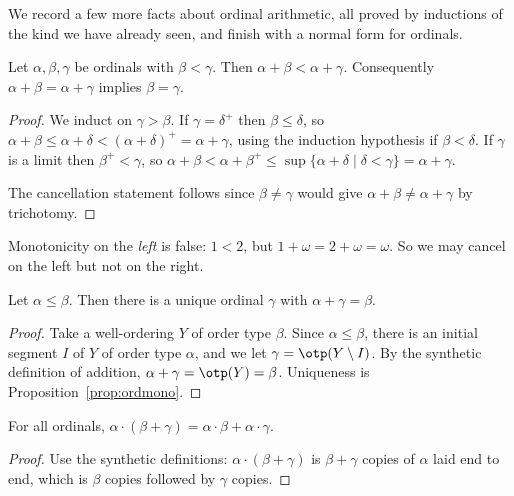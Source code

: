 We record a few more facts about ordinal arithmetic, all proved by inductions of the kind we have already seen, and finish with a normal form for ordinals.

\begin{proposition}\label{prop:ordmono}
  Let $\alpha, \beta, \gamma$ be ordinals with $\beta < \gamma$. Then $\alpha + \beta < \alpha + \gamma$. Consequently $\alpha + \beta = \alpha + \gamma$ implies $\beta = \gamma$.
\end{proposition}
\begin{proof}
  We induct on $\gamma > \beta$. If $\gamma = \delta^+$ then $\beta \leq \delta$, so $\alpha + \beta \leq \alpha + \delta < (\alpha+\delta)^+ = \alpha + \gamma$, using the induction hypothesis if $\beta < \delta$. If $\gamma$ is a limit then $\beta^+ < \gamma$, so $\alpha + \beta < \alpha + \beta^+ \leq \sup\{\alpha + \delta \mid \delta < \gamma\} = \alpha + \gamma$.

  The cancellation statement follows since $\beta \neq \gamma$ would give $\alpha + \beta \neq \alpha + \gamma$ by trichotomy.
\end{proof}

Monotonicity on the \emph{left} is false: $1 < 2$, but $1 + \omega = 2 + \omega = \omega$. So we may cancel on the left but not on the right.

\begin{proposition}
  Let $\alpha \leq \beta$. Then there is a unique ordinal $\gamma$ with $\alpha + \gamma = \beta$.
\end{proposition}
\begin{proof}
  Take a well-ordering $Y$ of order type $\beta$. Since $\alpha \leq \beta$, there is an initial segment $I$ of $Y$ of order type $\alpha$, and we let $\gamma = \otp(Y \setminus I)$. By the synthetic definition of addition, $\alpha + \gamma = \otp(Y) = \beta$. Uniqueness is Proposition~\ref{prop:ordmono}.
\end{proof}

\begin{proposition}[Distributivity]
  For all ordinals, $\alpha \cdot (\beta + \gamma) = \alpha\cdot\beta + \alpha\cdot\gamma$.
\end{proposition}
\begin{proof}
  Use the synthetic definitions: $\alpha\cdot(\beta+\gamma)$ is $\beta + \gamma$ copies of $\alpha$ laid end to end, which is $\beta$ copies followed by $\gamma$ copies.
\end{proof}

